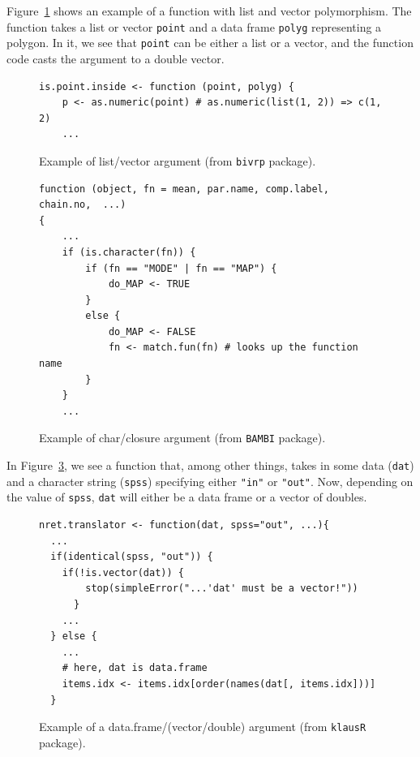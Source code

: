 \documentclass[acmsmall,10pt,review,anonymous]{acmart}\settopmatter{printfolios=true,printccs=false,printacmref=false}
\begin{document}
Figure~\ref{fig:listvec} shows an example of a function with list and vector polymorphism.
The function takes a list or vector {\tt point} and a data frame {\tt polyg} representing a polygon.
In it, we see that {\tt point} can be either a list or a vector, and the function code casts the argument to a double vector.

\begin{figure}[!hb]{\small\begin{lstlisting}[style=R]
is.point.inside <- function (point, polyg) {
    p <- as.numeric(point) # as.numeric(list(1, 2)) => c(1, 2)
    ...
\end{lstlisting}}\caption{Example of list/vector argument (from {\tt bivrp} package).}\label{fig:listvec}\end{figure}

\begin{figure}[!hb]{\small\begin{lstlisting}[style=R]
function (object, fn = mean, par.name, comp.label, chain.no,  ...) 
{
    ...
    if (is.character(fn)) {
        if (fn == "MODE" | fn == "MAP") {
            do_MAP <- TRUE
        }
        else {
            do_MAP <- FALSE
            fn <- match.fun(fn) # looks up the function name
        }
    }
    ...
\end{lstlisting}}\caption{Example of char/closure argument (from {\tt BAMBI} package).}\label{fig:charclos}\end{figure}

In Figure~\ref{fig:dfdbl}, we see a function that, among other things, takes in some data ({\tt dat}) and a character string ({\tt spss}) specifying either {\tt "in"} or {\tt "out"}.
Now, depending on the value of {\tt spss}, {\tt dat} will either be a data frame or a vector of doubles.

\begin{figure}[!hb]{\small\begin{lstlisting}[style=R]
nret.translator <- function(dat, spss="out", ...){
  ...
  if(identical(spss, "out")) {
    if(!is.vector(dat)) {
        stop(simpleError("...'dat' must be a vector!"))
      }
    ...
  } else {
    ...
    # here, dat is data.frame
    items.idx <- items.idx[order(names(dat[, items.idx]))]
  }
\end{lstlisting}}\caption{Example of a data.frame/(vector/double) argument (from {\tt klausR} package).}\label{fig:dfdbl}\end{figure}
\end{document}
